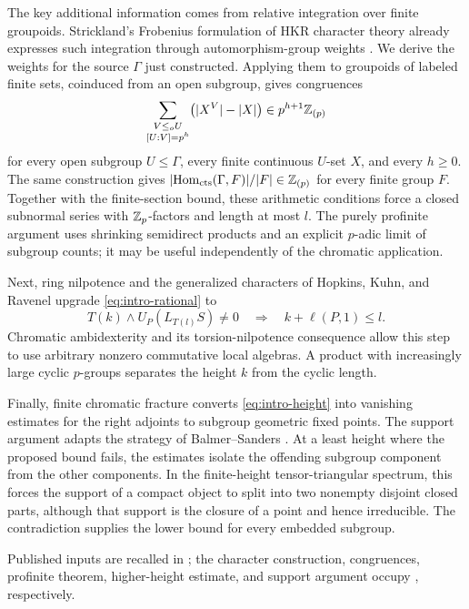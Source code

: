 The key additional information comes from relative integration over
finite groupoids. Strickland's Frobenius formulation of HKR character
theory already expresses such integration through automorphism-group
weights \cite[Section~10 and Theorem~10.2]{StricklandDuality}.
We derive the weights for the source \(\Gamma\) just constructed.
Applying them to groupoids of labeled finite sets, coinduced from an
open subgroup, gives congruences
\[
 \sum_{\substack{V\le_o U\\{}[U:V]=p^h}}
 \bigl(|X^V|-|X|\bigr)
 \in p^{h+1}\mathbb Z_{(p)}
\]
for every open subgroup \(U\le\Gamma\), every finite continuous \(U\)-set \(X\), and every \(h\ge0\). The same construction gives
\(\lvert\operatorname{Hom}_{\mathrm{cts}}(\Gamma,F)\rvert/\lvert F\rvert\in\mathbb Z_{(p)}\)
for every finite group \(F\). Together with the finite-section bound,
these arithmetic conditions force a closed subnormal series with
\(\mathbb Z_p\)-factors and length at most \(l\).
The purely profinite argument uses shrinking semidirect products and an explicit \(p\)-adic limit of subgroup counts; it may be useful independently of the chromatic application.

Next, ring nilpotence and the generalized characters of Hopkins, Kuhn, and Ravenel \cite{HS,HKR} upgrade \eqref{eq:intro-rational} to
\begin{equation}\label{eq:intro-height}
 T(k)\wedge U_P(L_{T(l)}S)\ne0
 \quad\Longrightarrow\quad k+\ell(P,1)\le l.
\end{equation}
Chromatic ambidexterity and its torsion-nilpotence consequence \cite{CSY} allow this step to use arbitrary nonzero commutative local algebras. A product with increasingly large cyclic \(p\)-groups separates the height \(k\) from the cyclic length.

Finally, finite chromatic fracture converts \eqref{eq:intro-height}
into vanishing estimates for the right adjoints to subgroup geometric
fixed points. The support argument adapts the strategy of
Balmer--Sanders \cite[proof of Theorem~9.1, \textup{(B)}$\Rightarrow$\textup{(A)}]{BS}.
At a least height where the proposed bound fails, the estimates
isolate the offending subgroup component from the other components.
In the finite-height tensor-triangular spectrum, this forces the
support of a compact object to split into two nonempty disjoint
closed parts, although that support is the closure of a point and
hence irreducible. The contradiction supplies the lower bound for
every embedded subgroup.

Published inputs are recalled in ; the character construction, congruences, profinite theorem, higher-height estimate, and support argument occupy , respectively.
